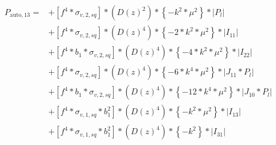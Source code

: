 \documentclass{article}
\begin{document}
\begin{equation}
\begin{aligned}  
P_{\mathrm{auto},13}=
&+\left[f^{4}*\sigma_{v,2,sq}\right]*\left(D(z)^{2}\right)*\left\{-k^{2}*\mu^{2}\right\}*\left|P_l\right| \\
&+\left[f^{4}*\sigma_{v,2,sq}\right]*\left(D(z)^{4}\right)*\left\{-2*k^{2}*\mu^{2}\right\}*\left|I_{11}\right| \\
&+\left[f^{4}*b_{1}*\sigma_{v,2,sq}\right]*\left(D(z)^{4}\right)*\left\{-4*k^{2}*\mu^{2}\right\}*\left|I_{22}\right| \\
&+\left[f^{4}*\sigma_{v,2,sq}\right]*\left(D(z)^{4}\right)*\left\{-6*k^{4}*\mu^{2}\right\}*\left|J_{11}*P_l\right| \\
&+\left[f^{4}*b_{1}*\sigma_{v,2,sq}\right]*\left(D(z)^{4}\right)*\left\{-12*k^{4}*\mu^{2}\right\}*\left|J_{10}*P_l\right| \\
&+\left[f^{4}*\sigma_{v,1,sq}*b_{1}^{2}\right]*\left(D(z)^{4}\right)*\left\{-k^{2}*\mu^{2}\right\}*\left|I_{13}\right| \\
&+\left[f^{4}*\sigma_{v,1,sq}*b_{1}^{2}\right]*\left(D(z)^{4}\right)*\left\{-k^{2}\right\}*\left|I_{31}\right| \\
\end{aligned}
\end{equation}
\end{document}
